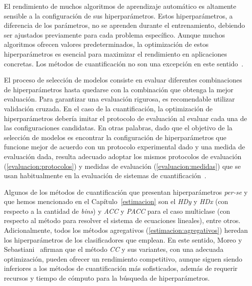 El rendimiento de muchos algoritmos de aprendizaje automático es altamente
sensible a la configuración de sus hiperparámetros. Estos hiperparámetros, a
diferencia de los parámetros, no se aprenden durante el entrenamiento, debiendo
ser ajustados previamente para cada problema específico. Aunque muchos
algoritmos ofrecen valores predeterminados, la optimización de estos
hiperparámetros es esencial para maximizar el rendimiento en aplicaciones
concretas. Los métodos de cuantificación no son una excepción en este
sentido~\cite{esuli2023learning}.

El proceso de selección de modelos consiste en evaluar diferentes combinaciones
de hiperparámetros hasta quedarse con la combinación que obtenga la mejor
evaluación. Para garantizar una evaluación rigurosa, es recomendable utilizar
validación cruzada. En el caso de la cuantificación, la optimización de
hiperparámetros debería imitar el protocolo de evaluación al evaluar cada una de
las configuraciones candidatas. En otras palabras, dado que el objetivo de la
selección de modelos es encontrar la configuración de hiperparámetros que
funcione mejor de acuerdo con un protocolo experimental dado y una medida de
evaluación dada, resulta adecuado adoptar los mismos protocolos de evaluación
(\ref{evaluacion:protocolos}) y medidas de evaluación (\ref{evaluacion:medidas})
que se usan habitualmente en la evaluación de sistemas de
cuantificación~\cite{moreo2022tweet, hassan2021pitfalls}.

Algunos de los métodos de cuantificación que presentan hiperparámetros {\it
per-se\/} y que hemos mencionado en el Capítulo~\ref{estimacion} son el {\it
HDy\/} y {\it HDx\/} (con respecto a la cantidad de {\it bins}) y {\it ACC\/} y
{\it PACC\/} para el caso multiclase (con respecto al método para resolver el
sistema de ecuaciones lineales), entre otros. Adicionalmente, todos los métodos
agregativos (\ref{estimacion:agregativos}) heredan los hiperparámetros de los
clasificadores que emplean. En este sentido, Moreo y
Sebastiani~\cite{moreo2021re} afirman que el método {\it CC\/} y sus variantes,
con una adecuada optimización, pueden ofrecer un rendimiento competitivo, aunque
siguen siendo inferiores a los métodos de cuantificación más sofisticados,
además de requerir recursos y tiempo de cómputo para la búsqueda de
hiperparámetros.

